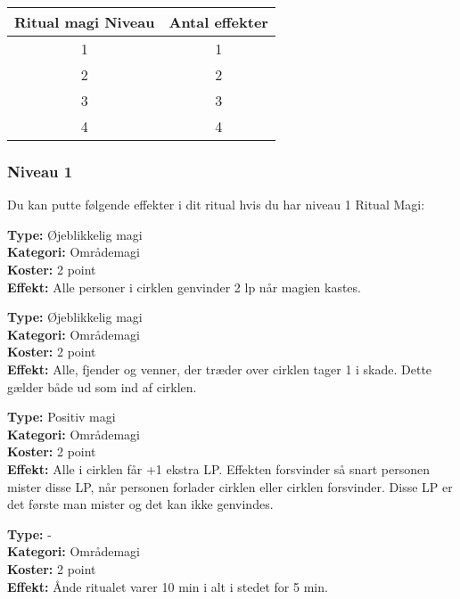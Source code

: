 \begin{table}[H]
    \centering
    \begin{tabular}{|c|c|}
    \rowcolor{cerulean!80}\hline
        Ritual magi Niveau & Antal effekter \\\hline
        1&1\\\hline
        2&2 \\\hline
        3&3\\\hline
        4&4\\\hline
    \end{tabular}
\end{table}

\subsubsection*{Niveau 1}
Du kan putte følgende effekter i dit ritual hvis du har niveau 1 Ritual Magi:

\begin{ritual*}[Helbredelse 1]
\textbf{Type:} Øjeblikkelig magi\\
\textbf{Kategori:} Områdemagi\\
\textbf{Koster:} 2 point\\
\textbf{Effekt:} Alle personer i cirklen genvinder 2 lp når magien kastes.
\end{ritual*}

\begin{ritual*}
\textbf{Type:} Øjeblikkelig magi\\
\textbf{Kategori:} Områdemagi\\
\textbf{Koster:} 2 point\\
\textbf{Effekt:} Alle, fjender og venner, der træder over cirklen tager 1 i skade. Dette gælder både ud som ind af cirklen.
\end{ritual*}

\begin{ritual*}
\textbf{Type:} Positiv magi\\
\textbf{Kategori:} Områdemagi\\
\textbf{Koster:} 2 point\\
\textbf{Effekt:} Alle i cirklen får +1 ekstra LP. Effekten forsvinder så snart personen mister disse LP, når personen forlader cirklen eller cirklen forsvinder. Disse LP er det første man mister og det kan ikke genvindes.
\end{ritual*}

\begin{ritual*}
\textbf{Type:} -\\
\textbf{Kategori:} Områdemagi\\
\textbf{Koster:} 2 point\\
\textbf{Effekt:} Ånde ritualet varer 10 min i alt i stedet for 5 min.
\end{ritual*}

